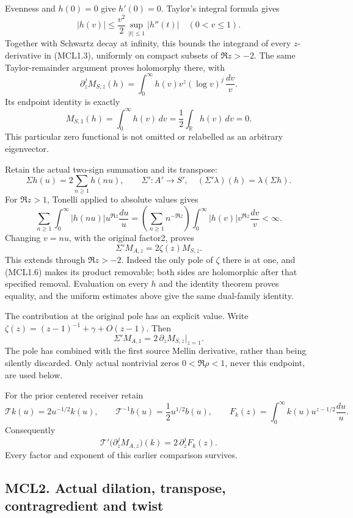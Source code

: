 Evenness and \(h(0)=0\) give \(h'(0)=0\). Taylor's integral formula
gives \[
 |h(v)|\le \frac{v^2}{2}\sup_{|t|\le1}|h''(t)| \quad(0<v\le1).
\] Together with Schwartz decay at infinity, this bounds the integrand
of every \(z\)-derivative in (MCL1.3), uniformly on compact subsets of
\(\Re z>-2\). The same Taylor-remainder argument proves holomorphy
there, with \[
 \partial_z^jM_{S,z}(h)
 =\int_0^\infty h(v)v^z(\log v)^j\,\frac{dv}{v}.
 \tag{MCL1.5}
\] Its endpoint identity is exactly \[
 M_{S,1}(h)=\int_0^\infty h(v)\,dv
 =\frac12\int_{\mathbb R}h(v)\,dv=0.
 \tag{MCL1.6}
\] This particular zero functional is not omitted or relabelled as an
arbitrary eigenvector.

Retain the actual two-sign summation and its transpose: \[
 \Sigma h(u)=2\sum_{n\ge1}h(nu),\qquad
 \Sigma':A'\longrightarrow S',\quad
 (\Sigma'\lambda)(h)=\lambda(\Sigma h).
 \tag{MCL1.7}
\] For \(\Re z>1\), Tonelli applied to absolute values gives \[
 \sum_{n\ge1}\int_0^\infty |h(nu)|u^{\Re z}\frac{du}{u}
 =\left(\sum_{n\ge1}n^{-\Re z}\right)
 \int_0^\infty |h(v)|v^{\Re z}\frac{dv}{v}<\infty.
\] Changing \(v=nu\), with the original factor2, proves \[
 \boxed{\Sigma'M_{A,z}=2\zeta(z)M_{S,z}.}
 \tag{MCL1.8}
\] This extends through \(\Re z>-2\). Indeed the only pole of \(\zeta\)
there is at one, and (MCL1.6) makes its product removable; both sides
are holomorphic after that specified removal. Evaluation on every \(h\)
and the identity theorem proves equality, and the uniform estimates
above give the same dual-family identity.

The contribution at the original pole has an explicit value. Write
\(\zeta(z)=(z-1)^{-1}+\gamma+O(z-1)\). Then \[
 \Sigma'M_{A,1}=2\,\partial_zM_{S,z}\big|_{z=1}.
 \tag{MCL1.9}
\] The pole has combined with the first source Mellin derivative, rather
than being silently discarded. Only actual nontrivial zeros
\(0<\Re\rho<1\), never this endpoint, are used below.

For the prior centered receiver retain \[
 \mathcal Tk(u)=2u^{-1/2}k(u),\qquad
 \mathcal T^{-1}b(u)=\frac12u^{1/2}b(u),\qquad
 F_k(z)=\int_0^\infty k(u)u^{z-1/2}\frac{du}{u}.
\] Consequently \[
 \mathcal T'\big(\partial_z^jM_{A,z}\big)(k)
 =2\,\partial_z^jF_k(z).
 \tag{MCL1.10}
\] Every factor and exponent of this earlier comparison survives.

\subsection{MCL2. Actual dilation, transpose, contragredient and
twist}\label{mcl2.-actual-dilation-transpose-contragredient-and-twist}


